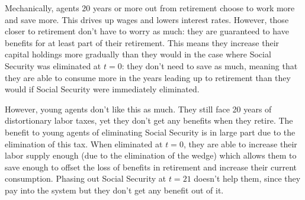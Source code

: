 \documentclass[12pt]{article}
\begin{document}
Mechanically, agents 20 years or more out from retirement choose to work more and save more. This drives up wages and lowers interest rates. However, those closer to retirement don't have to worry as much: they are guaranteed to have benefits for at least part of their retirement. This means they increase their capital holdings more gradually than they would in the case where Social Security was eliminated at $t=0$: they don't need to save as much, meaning that they are able to consume more in the years leading up to retirement than they would if Social Security were immediately eliminated.

However, young agents don't like this as much. They still face 20 years of distortionary labor taxes, yet they don't get any benefits when they retire. The benefit to young agents of eliminating Social Security is in large part due to the elimination of this tax. When eliminated at $t=0$, they are able to increase their labor supply enough (due to the elimination of the wedge) which allows them to save enough to offset the loss of benefits in retirement and increase their current consumption. Phasing out Social Security at $t=21$ doesn't help them, since they pay into the system but they don't get any benefit out of it. 
\end{document}
